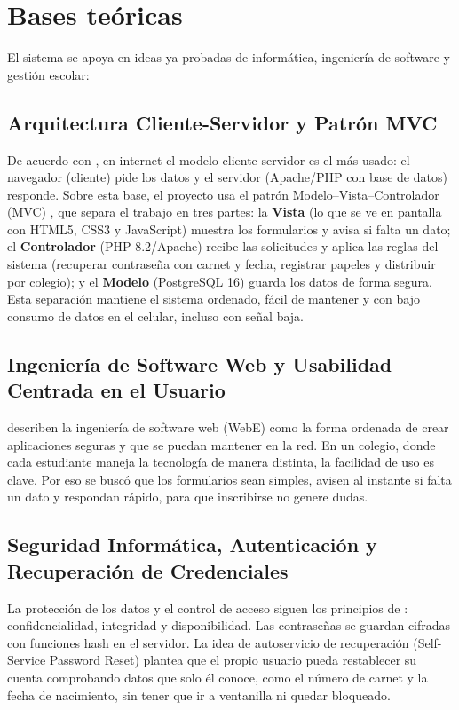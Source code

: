 \section{Bases teóricas}
\label{sec:bases_teoricas}

El sistema se apoya en ideas ya probadas de informática, ingeniería de software y gestión escolar:

\subsection{Arquitectura Cliente-Servidor y Patrón MVC}

De acuerdo con \textcite{tanenbaum2021}, en internet el modelo cliente-servidor es el más usado: el navegador (cliente) pide los datos y el servidor (Apache/PHP con base de datos) responde. Sobre esta base, el proyecto usa el patrón Modelo--Vista--Controlador (MVC) \parencite{pressman2020}, que separa el trabajo en tres partes: la \textbf{Vista} (lo que se ve en pantalla con HTML5, CSS3 y JavaScript) muestra los formularios y avisa si falta un dato; el \textbf{Controlador} (PHP 8.2/Apache) recibe las solicitudes y aplica las reglas del sistema (recuperar contraseña con carnet y fecha, registrar papeles y distribuir por colegio); y el \textbf{Modelo} (PostgreSQL 16) guarda los datos de forma segura. Esta separación mantiene el sistema ordenado, fácil de mantener y con bajo consumo de datos en el celular, incluso con señal baja.

\subsection{Ingeniería de Software Web y Usabilidad Centrada en el Usuario}

\textcite{pressman2020} describen la ingeniería de software web (WebE) como la forma ordenada de crear aplicaciones seguras y que se puedan mantener en la red. En un colegio, donde cada estudiante maneja la tecnología de manera distinta, la facilidad de uso es clave. Por eso se buscó que los formularios sean simples, avisen al instante si falta un dato y respondan rápido, para que inscribirse no genere dudas.

\subsection{Seguridad Informática, Autenticación y Recuperación de Credenciales}

La protección de los datos y el control de acceso siguen los principios de \textcite{stallings2021}: confidencialidad, integridad y disponibilidad. Las contraseñas se guardan cifradas con funciones hash en el servidor. La idea de autoservicio de recuperación (Self-Service Password Reset) plantea que el propio usuario pueda restablecer su cuenta comprobando datos que solo él conoce, como el número de carnet y la fecha de nacimiento, sin tener que ir a ventanilla ni quedar bloqueado.

